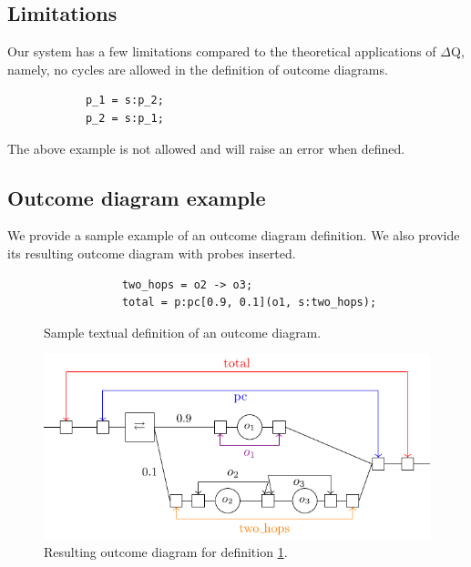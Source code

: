             
        \subsection{Limitations}
            Our system has a few limitations compared to the theoretical applications of $\Delta$Q, namely, no cycles are allowed in the definition of outcome diagrams. 
        
        \begin{verbatim}
            p_1 = s:p_2;
            p_2 = s:p_1;
        \end{verbatim}
        The above example is not allowed and will raise an error when defined.  

    \subsection{Outcome diagram example}
        We provide a sample example of an outcome diagram definition. We also provide its resulting outcome diagram with probes inserted.
        \begin{figure}[H]
        \begin{verbatim}
            two_hops = o2 -> o3;
            total = p:pc[0.9, 0.1](o1, s:two_hops);
        \end{verbatim}
            \caption{Sample textual definition of an outcome diagram.}
        \label{fig:outcd}
        \end{figure}

        \begin{figure}[H]
            \begin{center}
                \includegraphics[scale=1.3]{tikz/system.pdf}
            \end{center}
            \caption{Resulting outcome diagram for definition \ref{fig:outcd}.}%
        \end{figure}
